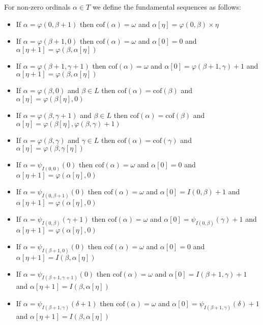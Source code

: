 \documentclass[10pt]{article}
\begin{document}
For non-zero ordinals \(\alpha\in T\) we define the fundamental sequences as follows:
\begin{itemize}
     \setlength{\itemsep}{1pt}
     \setlength{\parskip}{0pt}
     \setlength{\parsep}{0pt}
\item If \(\alpha=\varphi(0,\beta+1)\) then \(\text{cof}(\alpha)=\omega\) and \(\alpha[\eta]=\varphi(0,\beta)\times\eta\)
\item If \(\alpha=\varphi(\beta+1,0)\) then \(\text{cof}(\alpha)=\omega\) and \(\alpha[0]=0\) and \(\alpha[\eta+1]=\varphi(\beta,\alpha[\eta])\)
\item If \(\alpha=\varphi(\beta+1,\gamma+1)\) then \(\text{cof}(\alpha)=\omega\) and \(\alpha[0]=\varphi(\beta+1,\gamma)+1\) and \(\alpha[\eta+1]=\varphi(\beta,\alpha[\eta])\)
\item If \(\alpha=\varphi(\beta,0)\) and \(\beta\in L\) then \(\text{cof}(\alpha)=\text{cof}(\beta)\) and \(\alpha[\eta]=\varphi(\beta[\eta],0)\)
\item If \(\alpha=\varphi(\beta,\gamma+1)\) and \(\beta\in L\) then \(\text{cof}(\alpha)=\text{cof}(\beta)\) and \(\alpha[\eta]=\varphi(\beta[\eta],\varphi(\beta,\gamma)+1)\)
\item If \(\alpha=\varphi(\beta,\gamma)\) and \(\gamma\in L\) then \(\text{cof}(\alpha)=\text{cof}(\gamma)\) and \(\alpha[\eta]=\varphi(\beta,\gamma[\eta])\)

\bigskip

\item If \(\alpha=\psi_{I(0,0)}(0)\) then \(\text{cof}(\alpha)=\omega\) and \(\alpha[0]=0\) and \(\alpha[\eta+1]=\varphi(\alpha[\eta],0)\)
\item If \(\alpha=\psi_{I(0,\beta+1)}(0)\) then \(\text{cof}(\alpha)=\omega\) and \(\alpha[0]=I(0,\beta)+1\) and \(\alpha[\eta+1]=\varphi(\alpha[\eta],0)\)
\item If \(\alpha=\psi_{I(0,\beta)}(\gamma+1)\) then \(\text{cof}(\alpha)=\omega\) and \(\alpha[0]=\psi_{I(0,\beta)}(\gamma)+1\) and \(\alpha[\eta+1]=\varphi(\alpha[\eta],0)\)

\bigskip

\item If \(\alpha=\psi_{I(\beta+1,0)}(0)\) then \(\text{cof}(\alpha)=\omega\) and \(\alpha[0]=0\) and \(\alpha[\eta+1]=I(\beta,\alpha[\eta])\)
\item If \(\alpha=\psi_{I(\beta+1,\gamma+1)}(0)\) then \(\text{cof}(\alpha)=\omega\) and \(\alpha[0]=I(\beta+1,\gamma)+1\) and \(\alpha[\eta+1]=I(\beta,\alpha[\eta])\)
\item If \(\alpha=\psi_{I(\beta+1,\gamma)}(\delta+1)\) then \(\text{cof}(\alpha)=\omega\) and \(\alpha[0]=\psi_{I(\beta+1,\gamma)}(\delta)+1\) and \(\alpha[\eta+1]=I(\beta,\alpha[\eta])\)


\end{itemize}
\end{document}
